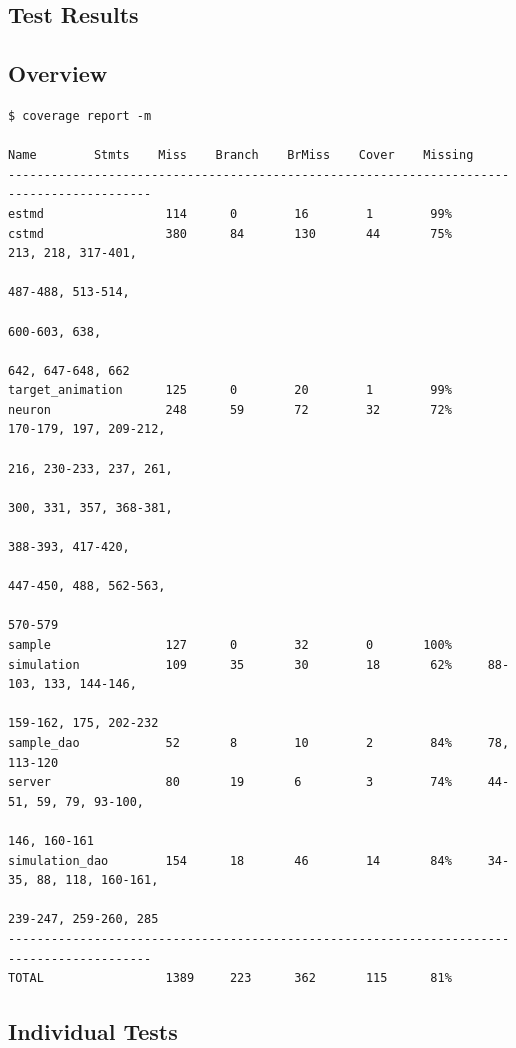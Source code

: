 \documentclass[a4paper,11pt]{article}
\begin{document}
\begin{appendices}
\section{Test Results}

\subsection{Overview}
\begin{verbatim}
$ coverage report -m

Name 		Stmts    Miss    Branch    BrMiss    Cover    Missing
------------------------------------------------------------------------------------------
estmd                 114      0        16        1        99%   
cstmd                 380      84       130       44       75%     213, 218, 317-401,
                                                                   487-488, 513-514,
                                                                   600-603, 638,
                                                                   642, 647-648, 662
target_animation      125      0        20        1        99%   
neuron                248      59       72        32       72%     170-179, 197, 209-212,
                                                                   216, 230-233, 237, 261,
                                                                   300, 331, 357, 368-381,
                                                                   388-393, 417-420,
                                                                   447-450, 488, 562-563,
                                                                   570-579
sample                127      0        32        0       100%   
simulation            109      35       30        18       62%     88-103, 133, 144-146,
                                                                   159-162, 175, 202-232
sample_dao            52       8        10        2        84%     78, 113-120
server                80       19       6         3        74%     44-51, 59, 79, 93-100,
                                                                   146, 160-161
simulation_dao        154      18       46        14       84%     34-35, 88, 118, 160-161,
                                                                   239-247, 259-260, 285
------------------------------------------------------------------------------------------
TOTAL                 1389     223      362       115      81%  
\end{verbatim}

\subsection{Individual Tests}

\end{appendices}
\end{document}
